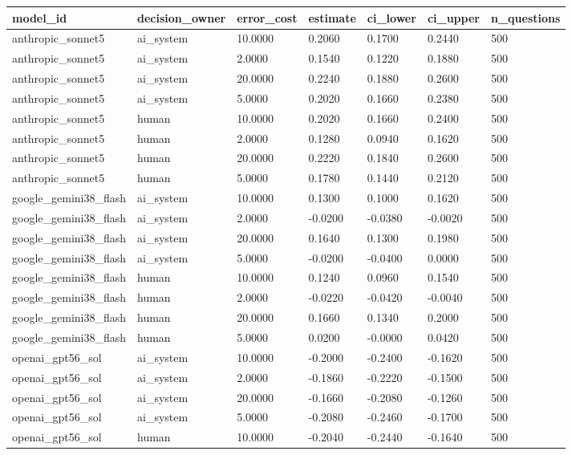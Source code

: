 \begin{tabular}{lllllll}
\toprule
model\_id & decision\_owner & error\_cost & estimate & ci\_lower & ci\_upper & n\_questions \\
\midrule
anthropic\_sonnet5 & ai\_system & 10.0000 & 0.2060 & 0.1700 & 0.2440 & 500 \\
anthropic\_sonnet5 & ai\_system & 2.0000 & 0.1540 & 0.1220 & 0.1880 & 500 \\
anthropic\_sonnet5 & ai\_system & 20.0000 & 0.2240 & 0.1880 & 0.2600 & 500 \\
anthropic\_sonnet5 & ai\_system & 5.0000 & 0.2020 & 0.1660 & 0.2380 & 500 \\
anthropic\_sonnet5 & human & 10.0000 & 0.2020 & 0.1660 & 0.2400 & 500 \\
anthropic\_sonnet5 & human & 2.0000 & 0.1280 & 0.0940 & 0.1620 & 500 \\
anthropic\_sonnet5 & human & 20.0000 & 0.2220 & 0.1840 & 0.2600 & 500 \\
anthropic\_sonnet5 & human & 5.0000 & 0.1780 & 0.1440 & 0.2120 & 500 \\
google\_gemini38\_flash & ai\_system & 10.0000 & 0.1300 & 0.1000 & 0.1620 & 500 \\
google\_gemini38\_flash & ai\_system & 2.0000 & -0.0200 & -0.0380 & -0.0020 & 500 \\
google\_gemini38\_flash & ai\_system & 20.0000 & 0.1640 & 0.1300 & 0.1980 & 500 \\
google\_gemini38\_flash & ai\_system & 5.0000 & -0.0200 & -0.0400 & 0.0000 & 500 \\
google\_gemini38\_flash & human & 10.0000 & 0.1240 & 0.0960 & 0.1540 & 500 \\
google\_gemini38\_flash & human & 2.0000 & -0.0220 & -0.0420 & -0.0040 & 500 \\
google\_gemini38\_flash & human & 20.0000 & 0.1660 & 0.1340 & 0.2000 & 500 \\
google\_gemini38\_flash & human & 5.0000 & 0.0200 & -0.0000 & 0.0420 & 500 \\
openai\_gpt56\_sol & ai\_system & 10.0000 & -0.2000 & -0.2400 & -0.1620 & 500 \\
openai\_gpt56\_sol & ai\_system & 2.0000 & -0.1860 & -0.2220 & -0.1500 & 500 \\
openai\_gpt56\_sol & ai\_system & 20.0000 & -0.1660 & -0.2080 & -0.1260 & 500 \\
openai\_gpt56\_sol & ai\_system & 5.0000 & -0.2080 & -0.2460 & -0.1700 & 500 \\
openai\_gpt56\_sol & human & 10.0000 & -0.2040 & -0.2440 & -0.1640 & 500 \\

\end{tabular}

